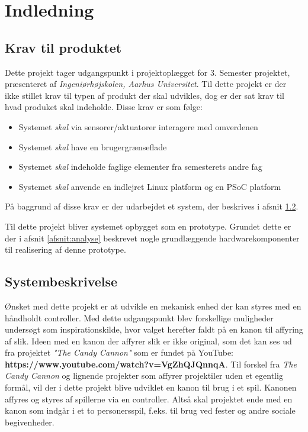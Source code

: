 \chapter{Indledning}
\section{Krav til produktet}
Dette projekt tager udgangspunkt i projektoplægget for 3. Semester projektet, præsenteret af \textit{Ingeniørhøjskolen, Aarhus Universitet}. Til dette projekt er der ikke stillet krav til typen af produkt der skal udvikles, dog er der sat krav til hvad produket skal indeholde. Disse krav er som følge:

\begin{itemize}
	\item{Systemet \textit{skal} via sensorer/aktuatorer interagere med omverdenen}
	\item{Systemet \textit{skal} have en brugergrænseflade}
	\item{Systemet \textit{skal} indeholde faglige elementer fra semesterets andre fag}
	\item{Systemet \textit{skal} anvende en indlejret Linux platform og en PSoC platform}
\end{itemize}

På baggrund af disse krav er der udarbejdet et system, der beskrives i afsnit \ref{afsnit:systembeskrivelse}.

Til dette projekt bliver systemet opbygget som en prototype. Grundet dette er der i afsnit \ref{afsnit:analyse} beskrevet nogle grundlæggende hardwarekomponenter til realisering af denne prototype.

\section{Systembeskrivelse}
\label{afsnit:systembeskrivelse}
Ønsket med dette projekt er at udvikle en mekanisk enhed der kan styres med en håndholdt controller. Med dette udgangspunkt blev forskellige muligheder undersøgt som inspirationskilde, hvor valget herefter faldt på en kanon til affyring af slik. Ideen med en kanon der affyrer slik er ikke original, som det kan ses ud fra projektet \textit{"The Candy Cannon"} som er fundet på YouTube: \textbf{https://www.youtube.com/watch?v=VgZhQJQnnqA}. Til forskel fra \textit{The Candy Cannon} og lignende projekter som affyrer projektiler uden et egentlig formål, vil der i dette projekt blive udviklet en kanon til brug i et spil. Kanonen affyres og styres af spillerne via en controller. Altså skal projektet ende med en kanon som indgår i et to personersspil, f.eks. til brug ved fester og andre sociale begivenheder.

